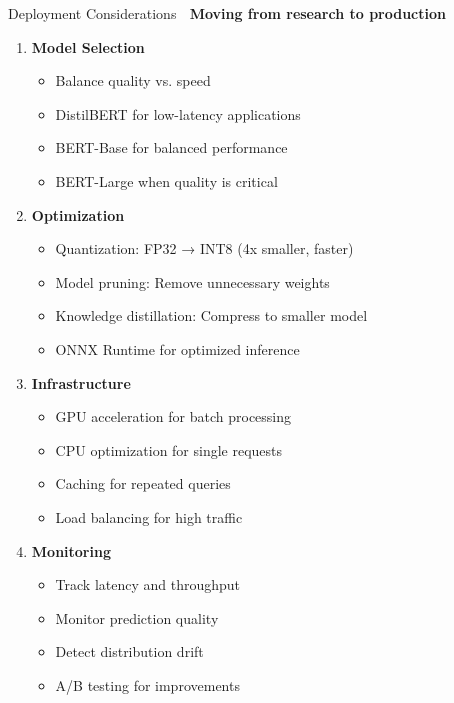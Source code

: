 \documentclass[aspectratio=169]{beamer}
\begin{document}
\begin{frame}[shrink=10]{Deployment Considerations 🚀}
\textbf{Moving from research to production}

\vspace{1em}

\begin{enumerate}\setlength{\itemsep}{0pt}
    \item \textbf{Model Selection}
    \begin{itemize}\setlength{\itemsep}{0pt}
        \item Balance quality vs. speed
        \item DistilBERT for low-latency applications
        \item BERT-Base for balanced performance
        \item BERT-Large when quality is critical
    \end{itemize}

    \vspace{0.5em}

    \item \textbf{Optimization}
    \begin{itemize}\setlength{\itemsep}{0pt}
        \item Quantization: FP32 → INT8 (4x smaller, faster)
        \item Model pruning: Remove unnecessary weights
        \item Knowledge distillation: Compress to smaller model
        \item ONNX Runtime for optimized inference
    \end{itemize}

    \vspace{0.5em}

    \item \textbf{Infrastructure}
    \begin{itemize}\setlength{\itemsep}{0pt}
        \item GPU acceleration for batch processing
        \item CPU optimization for single requests
        \item Caching for repeated queries
        \item Load balancing for high traffic
    \end{itemize}

    \vspace{0.5em}

    \item \textbf{Monitoring}
    \begin{itemize}\setlength{\itemsep}{0pt}
        \item Track latency and throughput
        \item Monitor prediction quality
        \item Detect distribution drift
        \item A/B testing for improvements
    \end{itemize}
\end{enumerate}
\end{frame}
\end{document}
